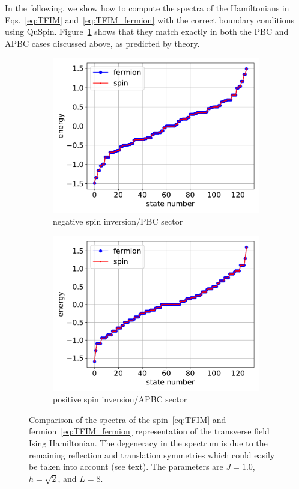 \documentclass{SciPost}
\newcommand\0{\scalebox{-1}[1]{0}}
\begin{document}
In the following, we show how to compute the spectra of the Hamiltonians in Eqs.~\eqref{eq:TFIM} and~\eqref{eq:TFIM_fermion} with the correct boundary conditions using QuSpin. Figure~\ref{fig:JW} shows that they match exactly in both the PBC and APBC cases discussed above, as predicted by theory.

\begin{figure}[t!]
	\centering
	\begin{subfigure}[b]{0.496\textwidth}
		\includegraphics[width=\textwidth]{JW_PBC.pdf}
		\caption{negative spin inversion/PBC sector}
	\end{subfigure}
	\begin{subfigure}[b]{0.496\textwidth}
		\includegraphics[width=\textwidth]{JW_APBC.pdf}
		\caption{positive spin inversion/APBC sector}
	\end{subfigure}
	\caption{\label{fig:JW} Comparison of the spectra of the spin~\eqref{eq:TFIM} and fermion~\eqref{eq:TFIM_fermion} representation of the transverse field Ising Hamiltonian. The degeneracy in the spectrum is due to the remaining reflection and translation symmetries which could easily be taken into account (see text). The parameters are $J=1.0$, $h=\sqrt{2}$, and $L=8$.}  
\end{figure}
 
\end{document}
